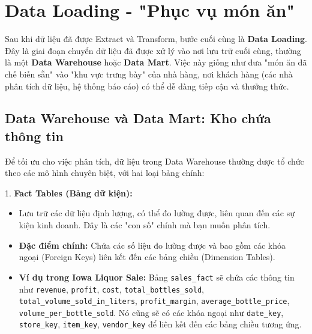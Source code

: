 \section{Data Loading - "Phục vụ món ăn"}

Sau khi dữ liệu đã được Extract và Transform, bước cuối cùng là \textbf{Data Loading}. Đây là giai đoạn chuyển dữ liệu đã được xử lý vào nơi lưu trữ cuối cùng, thường là một \textbf{Data Warehouse} hoặc \textbf{Data Mart}. Việc này giống như đưa "món ăn đã chế biến sẵn" vào "khu vực trưng bày" của nhà hàng, nơi khách hàng (các nhà phân tích dữ liệu, hệ thống báo cáo) có thể dễ dàng tiếp cận và thưởng thức.

\subsection{Data Warehouse và Data Mart: Kho chứa thông tin}

Để tối ưu cho việc phân tích, dữ liệu trong Data Warehouse thường được tổ chức theo các mô hình chuyên biệt, với hai loại bảng chính:

1.  \textbf{Fact Tables (Bảng dữ kiện):}
    \begin{itemize}
        \item Lưu trữ các dữ liệu định lượng, có thể đo lường được, liên quan đến các sự kiện kinh doanh. Đây là các "con số" chính mà bạn muốn phân tích.
        \item \textbf{Đặc điểm chính:} Chứa các số liệu đo lường được và bao gồm các khóa ngoại (Foreign Keys) liên kết đến các bảng chiều (Dimension Tables).
        \item \textbf{Ví dụ trong Iowa Liquor Sale:} Bảng \texttt{sales\_fact} sẽ chứa các thông tin như \texttt{revenue}, \texttt{profit}, \texttt{cost}, \texttt{total\_bottles\_sold}, \texttt{total\_volume\_sold\_in\_liters}, \texttt{profit\_margin}, \texttt{average\_bottle\_price}, \texttt{volume\_per\_bottle\_sold}. Nó cũng sẽ có các khóa ngoại như \texttt{date\_key}, \texttt{store\_key}, \texttt{item\_key}, \texttt{vendor\_key} để liên kết đến các bảng chiều tương ứng.
    \end{itemize}


